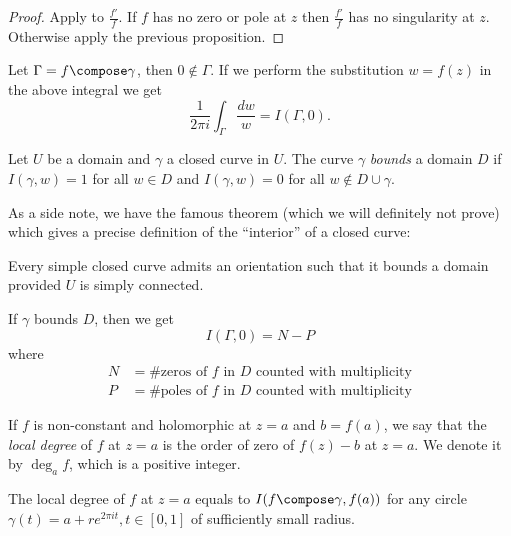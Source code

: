 \documentclass[a4paper]{article}
\begin{document}
\begin{proof}
  Apply  to \(\frac{f'}{f}\). If \(f\) has no zero or pole at \(z\) then \(\frac{f'}{f}\) has no singularity at \(z\). Otherwise apply the previous proposition.
\end{proof}

\begin{remark}
  Let \(\Gamma = f \compose \gamma\), then \(0 \notin \Gamma\). If we perform the substitution \(w = f(z)\) in the above integral we get
  \[
    \frac{1}{2\pi i} \int_\Gamma \frac{dw}{w} = I(\Gamma, 0).
  \]
\end{remark}

\begin{definition}
  Let \(U\) be a domain and \(\gamma\) a closed curve in \(U\). The curve \(\gamma\) \emph{bounds} a domain \(D\) if \(I(\gamma, w) = 1\) for all \(w \in D\) and \(I(\gamma, w) = 0\) for all \(w \notin D \cup \gamma\).
\end{definition}

As a side note, we have the famous theorem (which we will definitely not prove) which gives a precise definition of the ``interior'' of a closed curve:

\begin{theorem}
  Every simple closed curve admits an orientation such that it bounds a domain provided \(U\) is simply connected.
\end{theorem}

If \(\gamma\) bounds \(D\), then we get
\[
  I(\Gamma, 0) = N - P
\]
where
\begin{align*}
  N &= \#\text{zeros of \(f\) in \(D\) counted with multiplicity} \\
  P &= \#\text{poles of \(f\) in \(D\) counted with multiplicity}
\end{align*}

\begin{definition}
  If \(f\) is non-constant and holomorphic at \(z = a\) and \(b = f(a)\), we say that the \emph{local degree} of \(f\) at \(z = a\) is the order of zero of \(f(z) - b\) at \(z = a\). We denote it by \(\deg_a f\), which is a positive integer.
\end{definition}

\begin{proposition}
  The local degree of \(f\) at \(z = a\) equals to \(I(f \compose \gamma, f(a))\) for any circle \(\gamma(t) = a + re^{2\pi it}, t \in [0, 1]\) of sufficiently small radius.
\end{proposition}
\end{document}
